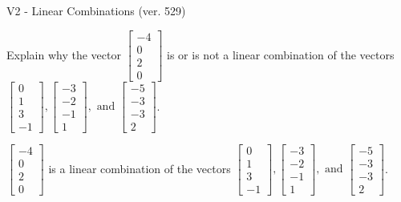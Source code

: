 \begin{exercise}
  \begin{exerciseTitle}V2 - Linear Combinations (ver. 529)\end{exerciseTitle}
  \begin{exerciseStatement}
    Explain why the vector \(\left[\begin{array}{c}
-4 \\
0 \\
2 \\
0
\end{array}\right]\)  is or is not a linear 
	combination of the vectors \(\left[\begin{array}{c}
0 \\
1 \\
3 \\
-1
\end{array}\right] , \left[\begin{array}{c}
-3 \\
-2 \\
-1 \\
1
\end{array}\right] , \text{ and } \left[\begin{array}{c}
-5 \\
-3 \\
-3 \\
2
\end{array}\right]\).
	


  \end{exerciseStatement}
  \begin{exerciseAnswer}
   \(\left[\begin{array}{c}
-4 \\
0 \\
2 \\
0
\end{array}\right]\) 
  	 is  
	a linear combination of the vectors \(\left[\begin{array}{c}
0 \\
1 \\
3 \\
-1
\end{array}\right] , \left[\begin{array}{c}
-3 \\
-2 \\
-1 \\
1
\end{array}\right] , \text{ and } \left[\begin{array}{c}
-5 \\
-3 \\
-3 \\
2
\end{array}\right]\).

	
  


  \end{exerciseAnswer}
\end{exercise}